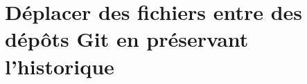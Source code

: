 \chapter{Déplacer des fichiers entre des dépôts Git en préservant l'historique}
\label{deplacer-historique-depots}
